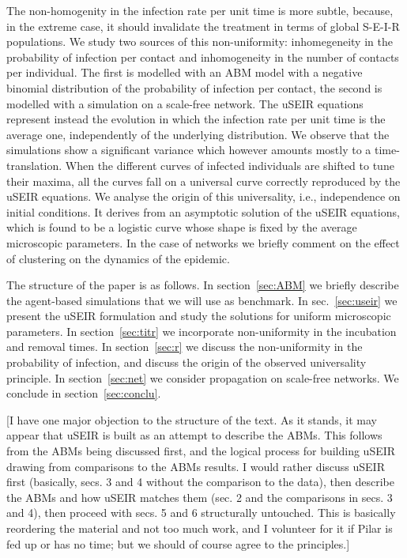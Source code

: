\documentclass[a4paper,oneside,11pt]{article}
\newcommand{\mycomment}[1]{\textcolor[rgb]{0.75,0,0}{[#1]}}
\begin{document}
The non-homogenity in the infection rate per unit time is more subtle, because, in the extreme case, it should invalidate the treatment in terms of global S-E-I-R populations. We study two sources of this non-uniformity: inhomegeneity in the probability of infection per contact and inhomogeneity in the number of contacts per individual. The first is modelled with an ABM model with a negative binomial distribution of the probability of infection per contact, the second is modelled with a simulation on a scale-free network. The uSEIR equations represent instead the evolution in which the infection rate per unit time is the average one, independently of the underlying distribution. We observe that the simulations show a significant variance which however amounts mostly to a time-translation. When the different curves of infected individuals are shifted to tune their maxima, all the curves fall on a universal curve correctly reproduced by the uSEIR equations. We analyse the origin of this universality, i.e., independence on initial conditions. It derives from an asymptotic solution of the uSEIR equations, which is found to be a logistic curve whose shape is fixed by the average microscopic parameters. In the case of networks we briefly comment on the effect of clustering on the dynamics of the epidemic. 

The structure of the paper is as follows. In section~\ref{sec:ABM} we briefly describe the agent-based simulations that we will use as benchmark.
In sec.~\ref{sec:useir} we present the uSEIR formulation and study the solutions for uniform microscopic parameters. In section~\ref{sec:titr} we incorporate non-uniformity in the incubation and removal times.  In section~\ref{sec:r} we discuss the non-uniformity in the probability of infection, and discuss the origin of the observed universality principle. In section~\ref{sec:net} we consider propagation on scale-free networks. We conclude in section~\ref{sec:conclu}. 


\mycomment{I have one major objection to the structure of the text. As it stands, it may appear that uSEIR is
built as an attempt to describe the ABMs. This follows from the ABMs being discussed first, and the logical process
for building uSEIR drawing from comparisons to the ABMs results. I would rather discuss uSEIR first (basically,
secs. 3 and 4 without the comparison to the data), then describe the ABMs and how uSEIR matches them (sec. 2 and the
comparisons in secs. 3 and 4), then proceed with secs. 5 and 6 structurally untouched. This is basically
reordering the material and not too much work, and I volunteer for it if Pilar is fed up or has no time;
but we should of course agree to the principles.}
\end{document}

